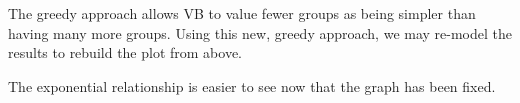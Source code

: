 \begin{minipage}{\linewidth}
\vspace{10pt}
\end{minipage}

The greedy approach allows VB to value fewer groups as being simpler than
having many more groups. Using this new, greedy approach, we may re-model
the results to rebuild the plot from above.



The exponential relationship is easier to see now that the graph
has been fixed.

